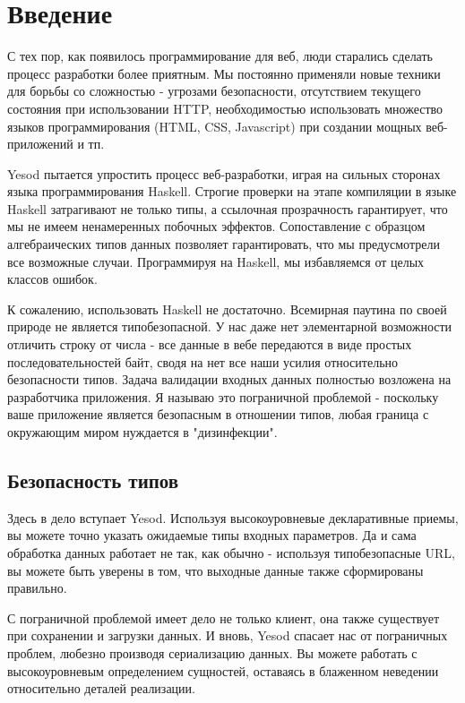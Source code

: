 \chapter{Введение}

С тех пор, как появилось программирование для веб, люди старались сделать процесс разработки более приятным. Мы постоянно применяли новые техники для борьбы со сложностью - угрозами безопасности, отсутствием текущего состояния при использовании HTTP, необходимостью использовать множество языков программирования (HTML, CSS, Javascript) при создании мощных веб-приложений и тп.

Yesod пытается упростить процесс веб-разработки, играя на сильных сторонах языка программирования Haskell. Строгие проверки на этапе компиляции в языке Haskell затрагивают не только типы, а ссылочная прозрачность гарантирует, что мы не имеем ненамеренных побочных эффектов. Сопоставление с образцом алгебраических типов данных позволяет гарантировать, что мы предусмотрели все возможные случаи. Программируя на Haskell, мы избавляемся от целых классов ошибок.

К сожалению, использовать Haskell не достаточно. Всемирная паутина по своей природе не является типобезопасной. У нас даже нет элементарной возможности отличить строку от числа - все данные в вебе передаются в виде простых последовательностей байт, сводя на нет все наши усилия относительно безопасности типов. Задача валидации входных данных полностью возложена на разработчика приложения. Я называю это пограничной проблемой - поскольку ваше приложение является безопасным в отношении типов, любая граница с окружающим миром нуждается в "дизинфекции".

\section{Безопасность типов}

Здесь в дело вступает Yesod. Используя высокоуровневые декларативные приемы, вы можете точно указать ожидаемые типы входных параметров. Да и сама обработка данных работает не так, как обычно - используя типобезопасные URL, вы можете быть уверены в том, что выходные данные также сформированы правильно.

С пограничной проблемой имеет дело не только клиент, она также существует при сохранении и загрузки данных. И вновь, Yesod спасает нас от пограничных проблем, любезно производя сериализацию данных. Вы можете работать с высокоуровневым определением сущностей, оставаясь в блаженном неведении относительно деталей реализации.

